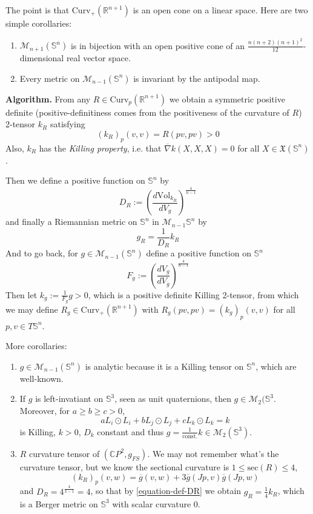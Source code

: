 The point is that
$\text{Curv}_+(\mathbb{R}^{n+1})$ is an open
cone on a linear
space. Here are two simple corollaries:

\begin{corollary}
\label{lemma-corollaries}
\begin{enumerate}
\item $\mathcal{M}_{n+1}(\mathbb{S}^n)$ is in
bijection with an open positive
cone of an
$\frac{n(n+2)(n+1)^2}{12}$-dimensional real
vector space.
\item Every metric on
$\mathcal{M}_{n-1}(\mathbb{S}^n)$ is
invariant by the
antipodal map.
\end{enumerate}
\end{corollary}

{\bf Algorithm.} From any $R\in
\text{Curv}_p(\mathbb{R}^{n+1})$ we obtain a
symmetric positive definite
(positive-definitiness comes from the
positiveness
of the curvature of $R$) 2-tensor  $k_R$
satisfying
$$
(k_R)_p(v,v)=R(pv,pv)>0
$$
Also, $k_R$ has the  {\it Killing property},
i.e. that $\overline{\nabla}k(X,X,X)=0$ for
all
$X\in\mathfrak{X}(\mathbb{S}^n)$.

Then we define a positive function on
 $\mathbb{S}^n$ by
\begin{equation}
\label{equation-def-DR}
D_R:=\left(\frac{d\text{Vol}_{k_R}}{dV_g}
\right)^{\frac{4}{n-1}}
\end{equation}
and finally a Riemannian metric on
$\mathbb{S}^n$ in
$\mathcal{M}_{n-1}\mathbb{S}^n$ by
$$
g_R=\frac{1}{D_R}k_R
$$
And to go back, for $g \in
\mathcal{M}_{n-1}(\mathbb{S}^n)$ define a
positive
function on $\mathbb{S}^n$
$$
F_g:=\left(\frac{dV_g}{dV_{\overline{g}}}
\right)^{\frac{4}{n-1}}
$$
Then let $k_g:=\frac{1}{F_g}g>0$, which is a
positive definite Killing 2-tensor,
from which we may define
$R_g\in\text{Curv}_+(\mathbb{R}^{n+1})$ with
$R_g(pv,pv)=(k_g)_p(v,v)$ for all $p,v\in
T\mathbb{S}^n$.

More corollaries:
\begin{corollary}
\label{lemma-corollaries2}
\begin{enumerate}
\item $g\in\mathcal{M}_{n-1}(\mathbb{S}^n)$
is analytic because it is a Killing
tensor on $\mathbb{S}^n$, which are
well-known.
\item If $g$ is left-invatiant on
$\mathbb{S}^3$, seen as unit quaternions,
then
$g\in\mathcal{M}_2(\mathbb{S}^3$. Moreover,
for $a\geq b\geq c>0$,
$$
aL_i\odot L_i+bL_j\odot L_j+cL_k\odot L_k=k
$$
is Killing, $k>0$,  $D_k$ constant and thus
$g=\frac{1}{\text{const.}}k
\in\mathcal{M}_2(\mathbb{S}^3)$.
\item $R$ curvature tensor of
$(\mathbb{C}P^{2},g_{FS})$. We may not
remember
what's the curvature tensor, but we know the
sectional curvature is $1\leq
\text{sec}(R)\leq 4$,
$$
(k_R)_p(v,w)=\overline{g}(v,w)+3\overline{g}
(Jp,v)\overline{g}(Jp,w)
$$
and $D_R=4^{\frac{4}{3-1}}=4$, so that by
\ref{equation-def-DR} we obtain
$g_R=\frac{1}{4}k_R$, which is a Berger
metric on $\mathbb{S}^3$ with scalar
curvature 0.
\end{enumerate}
\end{corollary}

